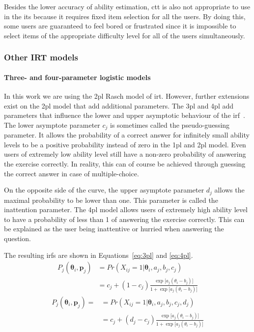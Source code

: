 Besides the lower accuracy of ability estimation, \gls{ctt} is also not appropriate to use in the \gls{its} because it requires fixed item selection for all the users.
By doing this, some users are guaranteed to feel bored or frustrated since it is impossible to select items of the appropriate difficulty level for all of the users simultaneously.

\subsubsection{Other IRT models}
\paragraph{Three- and four-parameter logistic models}
In this work we are using the \gls{2pl} Rasch model of \gls{irt}.
However, further extensions exist on the \gls{2pl} model that add additional parameters.
The \gls{3pl} and \gls{4pl} add parameters that influence the lower and upper asymptotic behaviour of the \gls{irf}~\cite{magis2017computerized}.
The lower asymptote parameter $c_j$ is sometimes called the pseudo-guessing parameter. 
It allows the probability of a correct answer for infinitely small ability levels to be a positive probability instead of zero in the \gls{1pl} and \gls{2pl} model. 
Even users of extremely low ability level still have a non-zero probability of answering the exercise correctly.
In reality, this can of course be achieved through guessing the correct answer in case of multiple-choice.

On the opposite side of the curve, the upper asymptote parameter $d_j$ allows the maximal probability to be lower than one. 
This parameter is called the inattention parameter. 
The \gls{4pl} model allows users of extremely high ability level to have a probability of less than 1 of answering the exercise correctly.
This can be explained as the user being inattentive or hurried when answering the question.

The resulting \glspl{irf} are shown in Equations~\ref{eq:3pl} and \ref{eq:4pl}.
\begin{equation}
\begin{split}
    \label{eq:3pl}
    P_{j}(\bm{\theta}_i,\bm{p}_j)
    & = Pr(X_{ij} = 1 | \bm{\theta}_i,a_j,b_j,c_j) \\
    & = c_j + (1-c_j) \frac{\exp\big[a_j(\theta_i - b_j)\big]}{1 + \exp\big[a_j(\theta_i - b_j)\big]}
\end{split}
\end{equation}
\begin{equation}
\begin{split}
    \label{eq:4pl}
    P_{j}(\bm{\theta}_i,\bm{p}_j) =
    & = Pr(X_{ij} = 1 | \bm{\theta}_i,a_j,b_j,c_j,d_j)\\
    & = c_j + (d_j-c_j) \frac{\exp\big[a_j(\theta_i - b_j)\big]}{1 + \exp\big[a_j(\theta_i - b_j)\big]}
\end{split}
\end{equation}

